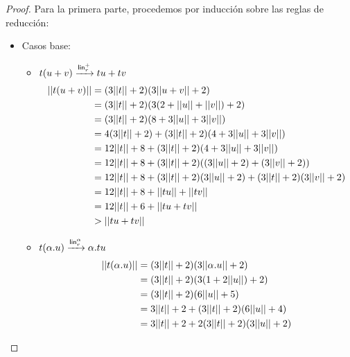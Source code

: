 \begin{proof}
  Para la primera parte, procedemos por inducción sobre las reglas de reducción:
  \begin{itemize}
    \item Casos base:
      \begin{itemize}
        \item \( t (u + v) \xrightarrow{\mathsf{lin}_r^+} t u + t v \)
        \begin{equation*}
          \begin{split}
            ||t (u + v)||
            & = (3 ||t|| + 2)(3 ||u + v|| + 2) \\
            & = (3 ||t|| + 2)(3 (2 + ||u|| + ||v||) + 2) \\
            & = (3 ||t|| + 2)(8 + 3 ||u|| + 3 ||v||) \\
            & = 4 (3 ||t|| + 2) + (3 ||t|| + 2)(4 + 3 ||u|| + 3 ||v||) \\
            & = 12 ||t|| + 8 + (3 ||t|| + 2)(4 + 3 ||u|| + 3 ||v||) \\
            & = 12 ||t|| + 8 + (3 ||t|| + 2)((3 ||u|| + 2) + (3 ||v|| + 2)) \\
            & = 12 ||t|| + 8 + (3 ||t|| + 2)(3 ||u|| + 2) + (3 ||t|| + 2)(3 ||v|| + 2) \\
            & = 12 ||t|| + 8 + ||t u|| + ||t v|| \\
            & = 12 ||t|| + 6 + ||t u + t v|| \\
            & > ||t u + t v||
          \end{split}
        \end{equation*}
        \item \( t (\alpha . u) \xrightarrow{\mathsf{lin}_r^\alpha} \alpha . t u \)
        \begin{equation*}
          \begin{split}
            \size{\app{t}{(\alpha . u)}}
            & = (3 \size{t} + 2)(3 \size{\alpha . u} + 2) \\
            & = (3 \size{t} + 2)(3 (1 + 2 \size{u}) + 2) \\
            & = (3 \size{t} + 2)(6 \size{u} + 5) \\
            & = 3 \size{t} + 2 + (3 \size{t} + 2)(6 \size{u} + 4) \\
            & = 3 \size{t} + 2 + 2 (3 \size{t} + 2)(3 \size{u} + 2) \\

\end{split}
\end{equation*}
\end{itemize}
\end{itemize}
\end{proof}
